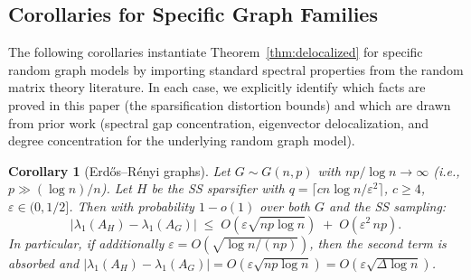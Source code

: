 \documentclass[11pt]{article}
\newtheorem{corollary}[theorem]{Corollary}
\theoremstyle{definition}
\newcommand{\eps}{\varepsilon}
\newcommand{\lamH}{\lambda_1(A_H)}
\newcommand{\lamG}{\lambda_1(A_G)}
\begin{document}
\subsection{Corollaries for Specific Graph Families}

The following corollaries instantiate Theorem~\ref{thm:delocalized} for specific
random graph models by importing standard spectral properties from the random
matrix theory literature. In each case, we explicitly identify which facts are
proved in this paper (the sparsification distortion bounds) and which are drawn
from prior work (spectral gap concentration, eigenvector delocalization, and degree
concentration for the underlying random graph model).

\begin{corollary}[Erd\H{o}s--R\'{e}nyi graphs]\label{cor:er}
Let $G \sim G(n, p)$ with $np/\log n \to \infty$ (i.e., $p \gg (\log n)/n$).
Let $H$ be the SS sparsifier with $q = \lceil cn\log n/\eps^2 \rceil$, $c \geq 4$,
$\eps \in (0, 1/2]$. Then with probability $1 - o(1)$ over both $G$ and
the SS sampling:
\[
|\lamH - \lamG| \;\leq\;
O\!\left(\eps\sqrt{np\log n}\right)
\;+\; O\!\left(\eps^2\,np\right).
\]
In particular, if additionally $\eps = O\!\left(\sqrt{\log n / (np)}\right)$,
then the second term is absorbed and
$|\lamH - \lamG| = O\!\left(\eps\sqrt{np\log n}\right)
= O\!\left(\eps\sqrt{\Delta\log n}\right)$.
\end{corollary}
\end{document}
